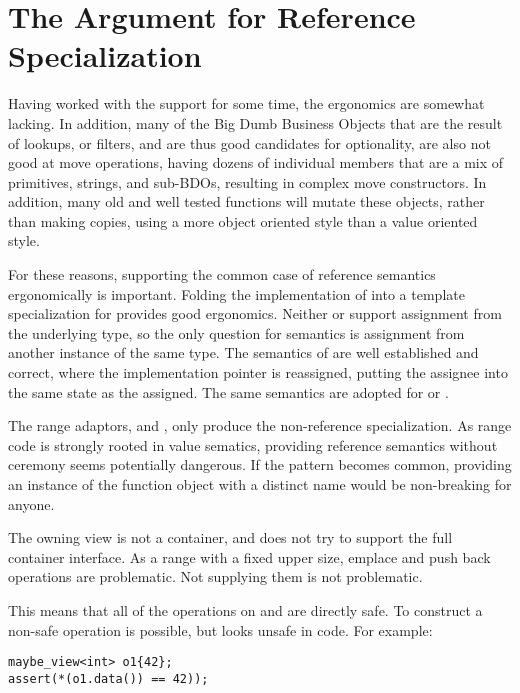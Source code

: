 \documentclass[a4paper,10pt,oneside,openany,final,article]{memoir}
\begin{document}
\section{The Argument for Reference Specialization}
Having worked with the  support for some time, the ergonomics are somewhat lacking. In addition, many of the Big Dumb Business Objects that are the result of lookups, or filters, and are thus good candidates for optionality, are also not good at move operations, having dozens of individual members that are a mix of primitives, strings, and sub-BDOs, resulting in complex move constructors. In addition, many old and well tested functions will mutate these objects, rather than making copies, using a more object oriented style than a value oriented style.

For these reasons, supporting the common case of reference semantics ergonomically is important. Folding the implementation of  into a template specialization for  provides good ergonomics. Neither  or  support assignment from the underlying type, so the only question for semantics is assignment from another instance of the same type. The semantics of  are well established and correct, where the implementation pointer is reassigned, putting the assignee into the same state as the assigned. The same semantics are adopted for  or .

The range adaptors,  and , only produce the non-reference specialization. As range code is strongly rooted in value sematics, providing reference semantics without ceremony seems potentially dangerous. If the pattern becomes common, providing an instance of the function object with a distinct name would be non-breaking for anyone.

The owning view  is not a container, and does not try to support the full container interface. As a range with a fixed upper size, emplace and push back operations are problematic. Not supplying them is not problematic.

This means that all of the operations on  and  are directly safe. To construct a non-safe operation is possible, but looks unsafe in code. For example:

\begin{minipage}[t]{\columnwidth}
  \begin{verbatim}
maybe_view<int> o1{42};
assert(*(o1.data()) == 42));
  \end{verbatim}
\end{minipage}
\end{document}
